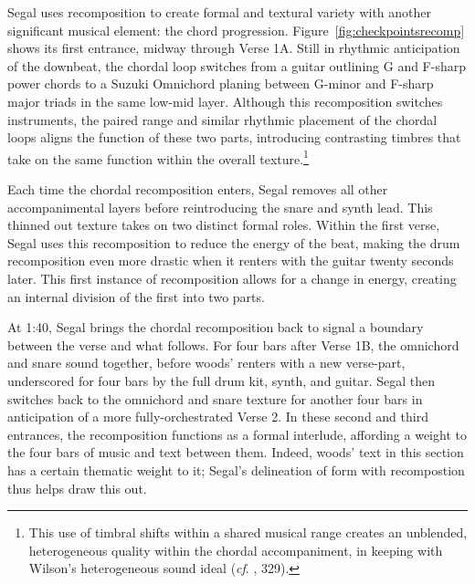 Segal uses recomposition to create formal and textural variety with another significant musical element: the chord progression. Figure~\ref{fig:checkpointsrecomp} shows its first entrance, midway through Verse 1A. Still in rhythmic anticipation of the downbeat, the chordal loop switches from a guitar outlining G and F-sharp power chords to a Suzuki Omnichord planing between G-minor and F-sharp major triads in the same low-mid layer. Although this recomposition switches instruments, the paired range and similar rhythmic placement of the chordal loops aligns the function of these two parts, introducing contrasting timbres that take on the same function within the overall texture.\footnote{This use of timbral shifts within a shared musical range creates an unblended, heterogeneous quality within the chordal accompaniment, in keeping with Wilson's heterogeneous sound ideal (\textit{cf}.  \cite{ollywilsonHeterogeneousSoundIdeal1992}, 329).}

Each time the chordal recomposition enters, Segal removes all other accompanimental layers before reintroducing the snare and synth lead. This thinned out texture takes on two distinct formal roles. Within the first verse, Segal uses this recomposition to reduce the energy of the beat, making the drum recomposition even more drastic when it renters with the guitar twenty seconds later. This first instance of recomposition allows for a change in energy, creating an internal division of the first into two parts.

At 1:40, Segal brings the chordal recomposition back to signal a boundary between the verse and what follows. For four bars after Verse 1B, the omnichord and snare sound together, before woods' renters with a new verse-part, underscored for four bars by the full drum kit, synth, and guitar. Segal then switches back to the omnichord and snare texture for another four bars in anticipation of a more fully-orchestrated Verse 2. In these second and third entrances, the recomposition functions as a formal interlude, affording a weight to the four bars of music and text between them. Indeed, woods' text in this section has a certain thematic weight to it; Segal's delineation of form with recompostion thus helps draw this out.

